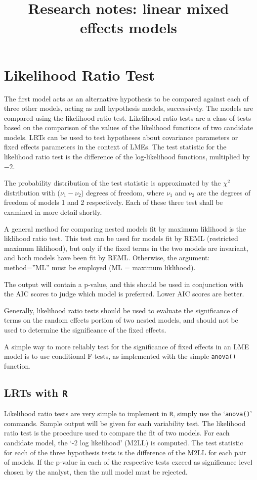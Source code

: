 \documentclass[12pt, a4paper]{article}
\title{Research notes: linear mixed effects models}
\author{ } \date{ }
\theoremstyle{plain}
\theoremstyle{definition}
\theoremstyle{remark}
\begin{document}
	
	\tableofcontents

\section{Likelihood Ratio Test}
The first model acts as an alternative hypothesis to be compared against each of three other models, acting as null hypothesis models, successively. The models are compared using the likelihood ratio test. Likelihood ratio tests are a class of tests based on the comparison of the values of the likelihood functions of two candidate models. LRTs can be used to test hypotheses about covariance parameters or fixed effects parameters in the context of LMEs. The test statistic for the likelihood ratio test is the difference of the log-likelihood functions, multiplied by $-2$.

The probability distribution of the test statistic is approximated by the $\chi^2$ distribution with ($\nu_{1} - \nu_{2}$) degrees of freedom, where $\nu_{1}$ and $\nu_{2}$ are the degrees of freedom of models 1 and 2 respectively. Each of these three test shall be examined in more detail shortly.



A general method for comparing nested models fit by maximum liklihood is the liklihood ratio 
test. This test can be used for models fit by REML (restricted maximum liklihood), but only if the 
fixed terms in the two models are invariant, and both models have been fit by REML. Otherwise, 
the argument: method=”ML” must be employed (ML = maximum liklihood). 




The output will contain a p-value, and this should be used in conjunction with the AIC scores to 
judge which model is preferred. Lower AIC scores are better. 

Generally, likelihood ratio tests should be used to evaluate the significance of terms on the 
random effects portion of two nested models, and should not be used to determine the 
significance of the fixed effects. 

A simple way to more reliably test for the significance of fixed effects in an LME model is to use 
conditional F-tests, as implemented with the simple \texttt{anova()} function. 



\subsection{LRTs with \texttt{R}}
Likelihood ratio tests are very simple to implement in \texttt{R}, simply use the `\texttt{anova()}'
commands. Sample output will be given for each variability test. The likelihood ratio
test is the procedure used to compare the fit of two models. For each candidate model,
the `-2 log likelihood' (M2LL) is computed. The test statistic for each of the three
hypothesis tests is the difference of the M2LL for each pair of models. If the p-value
in each of the respective tests exceed as significance level chosen by the analyst, then
the null model must be rejected.
\end{document}
